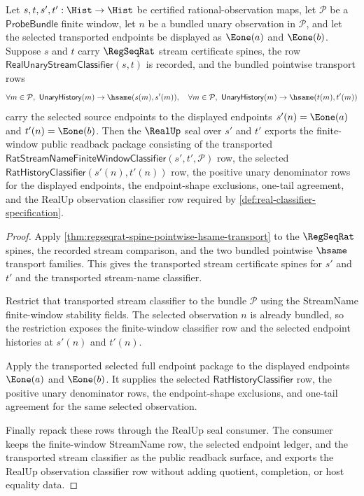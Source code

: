 \begin{theorem}
\label{thm:regseqrat-seal-finite-window-transport-package}
Let $s,t,s',t':\Hist\to\Hist$ be certified rational-observation maps, let
$\mathcal P$ be a $\mathsf{ProbeBundle}$ finite window, let $n$ be a bundled
unary observation in $\mathcal P$, and let the selected transported endpoints
be displayed as $\Eone(a)$ and $\Eone(b)$. Suppose $s$ and $t$ carry
$\RegSeqRat$ stream certificate spines, the row
$\mathsf{RealUnaryStreamClassifier}(s,t)$ is recorded, and the bundled
pointwise transport rows
$$
\forall m\in\mathcal P,\ \mathsf{UnaryHistory}(m)\to\hsame(s(m),s'(m)),
\quad
\forall m\in\mathcal P,\ \mathsf{UnaryHistory}(m)\to\hsame(t(m),t'(m))
$$
carry the selected source endpoints to the displayed endpoints
$s'(n)=\Eone(a)$ and $t'(n)=\Eone(b)$. Then the $\RealUp$ seal over $s'$ and
$t'$ exports the finite-window public readback package consisting of the
transported
$\mathsf{RatStreamNameFiniteWindowClassifier}(s',t',\mathcal P)$ row, the
selected $\mathsf{RatHistoryClassifier}(s'(n),t'(n))$ row, the positive unary
denominator rows for the displayed endpoints, the endpoint-shape exclusions,
one-tail agreement, and the RealUp observation classifier row required by
\autoref{def:real-classifier-specification}.
\end{theorem}
\begin{proof}
Apply \autoref{thm:regseqrat-spine-pointwise-hsame-transport} to the
$\RegSeqRat$ spines, the recorded stream comparison, and the two bundled
pointwise $\hsame$ transport families. This gives the transported stream
certificate spines for $s'$ and $t'$ and the transported stream-name classifier.

Restrict that transported stream classifier to the bundle $\mathcal P$ using
the StreamName finite-window stability fields. The selected observation $n$ is
already bundled, so the restriction exposes the finite-window classifier row and
the selected endpoint histories at $s'(n)$ and $t'(n)$.

Apply the transported selected full endpoint package to the displayed endpoints
$\Eone(a)$ and $\Eone(b)$. It supplies the selected
$\mathsf{RatHistoryClassifier}$ row, the positive unary denominator rows, the
endpoint-shape exclusions, and one-tail agreement for the same selected
observation.

Finally repack these rows through the RealUp seal consumer. The consumer keeps
the finite-window StreamName row, the selected endpoint ledger, and the
transported stream classifier as the public readback surface, and exports the
RealUp observation classifier row without adding quotient, completion, or host
equality data.
\end{proof}

